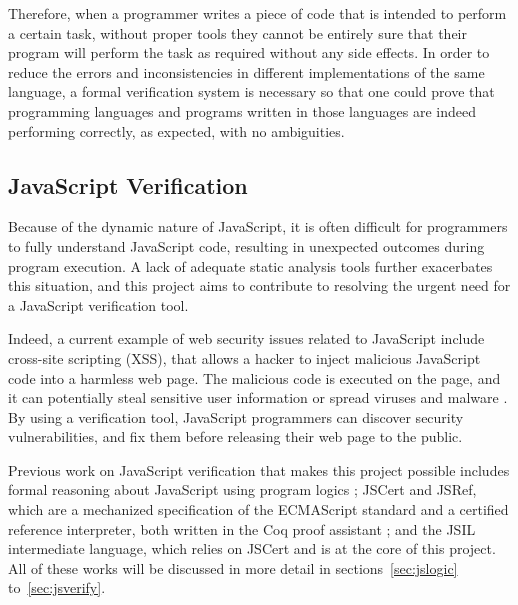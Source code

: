 \documentclass[a4paper,11pt,twoside]{report}
\begin{document}
Therefore, when a programmer writes a piece of code that is intended to perform a certain task, without proper tools they cannot be entirely sure that their program will perform the task as required without any side effects. In order to reduce the errors and inconsistencies in different implementations of the same language, a formal verification system is necessary so that one could prove that programming languages and programs written in those languages are indeed performing correctly, as expected, with no ambiguities.

\subsection{JavaScript Verification}
Because of the dynamic nature of JavaScript, it is often difficult for programmers to fully understand JavaScript code, resulting in unexpected outcomes during program execution. A lack of adequate static analysis tools further exacerbates this situation, and this project aims to contribute to resolving the urgent need for a JavaScript verification tool. 

Indeed, a current example of web security issues related to JavaScript include cross-site scripting (XSS), that allows a hacker to inject malicious JavaScript code into a harmless web page. The malicious code is executed on the page, and it can potentially steal sensitive user information or spread viruses and malware \cite{security}. By using a verification tool, JavaScript programmers can discover security vulnerabilities, and fix them before releasing their web page to the public.

Previous work on JavaScript verification that makes this project possible includes formal reasoning about JavaScript using program logics \cite{Gardner:2012}; JSCert and JSRef, which are a mechanized specification of the ECMAScript standard and a certified reference interpreter, both written in the Coq proof assistant \cite{Bodin:2014}; and the JSIL intermediate language, which relies on JSCert and is at the core of this project. All of these works will be discussed in more detail in sections~\ref{sec:jslogic} to~\ref{sec:jsverify}.
\end{document}

